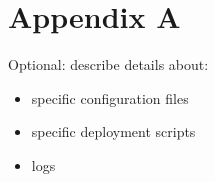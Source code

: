 %
%
%
\chapter{\label{chap:appendix}Appendix A}

Optional: describe details about:
\begin{itemize}
    \item specific configuration files
    \item specific deployment scripts
    \item logs
\end{itemize}